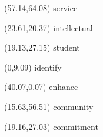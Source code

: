 \documentclass[11pt]{letter} %
\begin{document}
\begin{textblock}{0}(57.14,64.08) \scriptsize{service} \end{textblock}
\begin{textblock}{0}(23.61,20.37) \tiny{intellectual} \end{textblock}
\begin{textblock}{0}(19.13,27.15) \Huge{student} \end{textblock}
\begin{textblock}{0}(0,9.09) \small{identify} \end{textblock}
\begin{textblock}{0}(40.07,0.07) \tiny{enhance} \end{textblock}
\begin{textblock}{0}(15.63,56.51) \Large{community} \end{textblock}
\begin{textblock}{0}(19.16,27.03) \large{commitment} \end{textblock}
\end{document}
